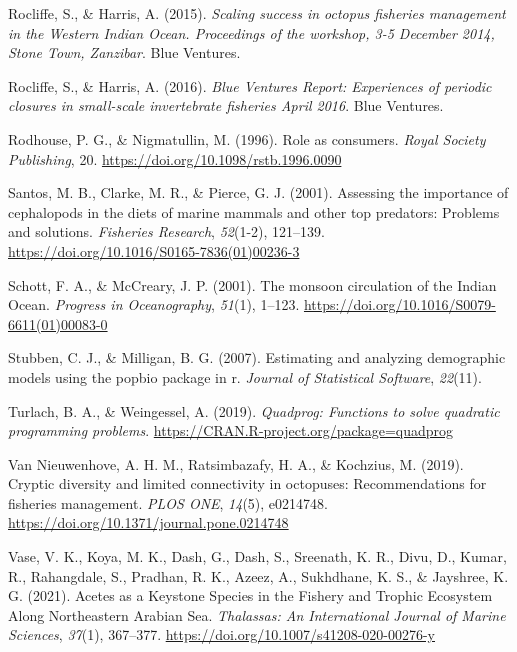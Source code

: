 \documentclass[
]{article}
\newlength{\cslhangindent}
\newlength{\cslentryspacingunit} %
\newenvironment{CSLReferences}[2] %
 {%
  \setlength{\parindent}{0pt}
  \ifodd #1
  \let\oldpar\par
  \def\par{\hangindent=\cslhangindent\oldpar}
  \fi
  \setlength{\parskip}{#2\cslentryspacingunit}
 }%
 {}
\begin{document}
\begin{CSLReferences}{1}{2}
\leavevmode{}%
Rocliffe, S., \& Harris, A. (2015). \emph{Scaling success in octopus fisheries management in the {Western Indian Ocean}. {Proceedings} of the workshop, 3-5 {December} 2014, {Stone Town}, {Zanzibar}}. Blue Ventures.

\leavevmode{}%
Rocliffe, S., \& Harris, A. (2016). \emph{Blue {Ventures Report}: {Experiences} of periodic closures in small-scale invertebrate fisheries {April} 2016}. Blue Ventures.

\leavevmode{}%
Rodhouse, P. G., \& Nigmatullin, M. (1996). Role as consumers. \emph{Royal Society Publishing}, 20. \url{https://doi.org/10.1098/rstb.1996.0090}

\leavevmode{}%
Santos, M. B., Clarke, M. R., \& Pierce, G. J. (2001). Assessing the importance of cephalopods in the diets of marine mammals and other top predators: Problems and solutions. \emph{Fisheries Research}, \emph{52}(1-2), 121--139. \url{https://doi.org/10.1016/S0165-7836(01)00236-3}

\leavevmode{}%
Schott, F. A., \& McCreary, J. P. (2001). The monsoon circulation of the {Indian Ocean}. \emph{Progress in Oceanography}, \emph{51}(1), 1--123. \url{https://doi.org/10.1016/S0079-6611(01)00083-0}

\leavevmode{}%
Stubben, C. J., \& Milligan, B. G. (2007). Estimating and analyzing demographic models using the popbio package in r. \emph{Journal of Statistical Software}, \emph{22}(11).

\leavevmode{}%
Turlach, B. A., \& Weingessel, A. (2019). \emph{Quadprog: Functions to solve quadratic programming problems}. \url{https://CRAN.R-project.org/package=quadprog}

\leavevmode{}%
Van Nieuwenhove, A. H. M., Ratsimbazafy, H. A., \& Kochzius, M. (2019). Cryptic diversity and limited connectivity in octopuses: {Recommendations} for fisheries management. \emph{PLOS ONE}, \emph{14}(5), e0214748. \url{https://doi.org/10.1371/journal.pone.0214748}

\leavevmode{}%
Vase, V. K., Koya, M. K., Dash, G., Dash, S., Sreenath, K. R., Divu, D., Kumar, R., Rahangdale, S., Pradhan, R. K., Azeez, A., Sukhdhane, K. S., \& Jayshree, K. G. (2021). Acetes as a {Keystone Species} in the {Fishery} and {Trophic Ecosystem Along Northeastern Arabian Sea}. \emph{Thalassas: An International Journal of Marine Sciences}, \emph{37}(1), 367--377. \url{https://doi.org/10.1007/s41208-020-00276-y}


\end{CSLReferences}
\end{document}
